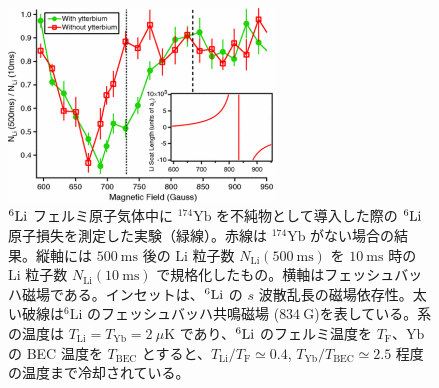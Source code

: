 \begin{figure}[t]
\centering
\includegraphics[width=70mm]{eps/imp-bcs-expe.eps}
\caption{${}^6\mathrm{Li}$ フェルミ原子気体中に ${}^{174}\mathrm{Yb}$ を不純物として導入した際の ${}^6\mathrm{Li}$ 原子損失を測定した実験（緑線）\cite{kharamov2012}。赤線は ${}^{174}\mathrm{Yb}$ がない場合の結果。縦軸には $500\ \mathrm{ms}$ 後の $\mathrm{Li}$ 粒子数 $N_{\mathrm{Li}}(500\ \mathrm{ms})$ を $10\ \mathrm{ms}$ 時の $\mathrm{Li}$ 粒子数 $N_{\mathrm{Li}}(10\ \mathrm{ms})$ で規格化したもの。横軸はフェッシュバッハ磁場である。インセットは、${}^6\mathrm{Li}$ の $s$ 波散乱長の磁場依存性。太い破線は${}^{6}\mathrm{Li}$ のフェッシュバッハ共鳴磁場 ($834\ \mathrm{G}$)を表している。系の温度は $T_{\text{Li}}=T_{\text{Yb}}=2\ \mu \mathrm{K}$ であり、${}^6\mathrm{Li}$ のフェルミ温度を $T_{\text{F}}$、$\text{Yb}$ の BEC 温度を $T_{\text{BEC}}$ とすると、$T_{\text{Li}}/T_{\text{F}} \simeq 0.4$, $T_{\text{Yb}}/T_{\text{BEC}}\simeq 2.5$ 程度の温度まで冷却されている。}
\label{fig:imp-mixture}
\end{figure}

